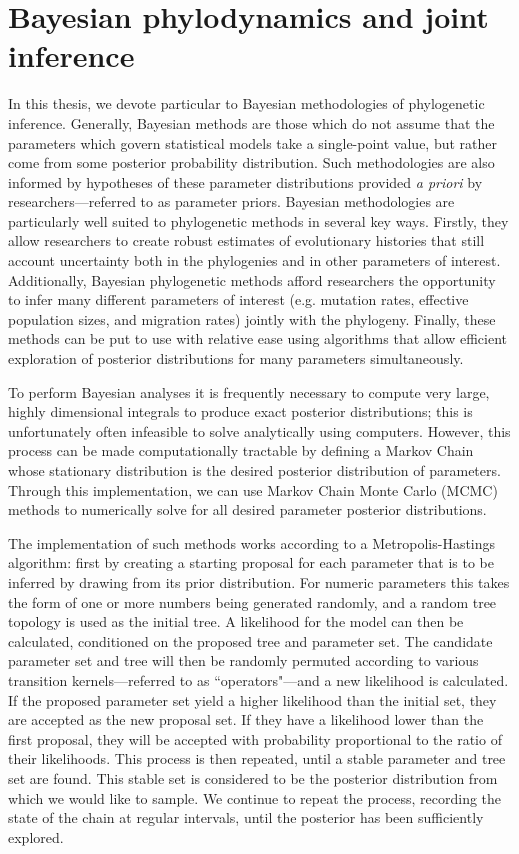 \section{Bayesian phylodynamics and joint inference}

In this thesis, we devote particular to Bayesian methodologies of phylogenetic inference.
Generally, Bayesian methods are those which do not assume that the parameters which govern statistical models take a single-point value, but rather come from some posterior probability distribution.
Such methodologies are also informed by hypotheses of these parameter distributions provided \textit{a priori} by researchers---referred to as parameter priors.
Bayesian methodologies are particularly well suited to phylogenetic methods in several key ways.
Firstly, they allow researchers to create robust estimates of evolutionary histories that still account uncertainty both in the phylogenies and in other parameters of interest.
Additionally, Bayesian phylogenetic methods afford researchers the opportunity to infer many different parameters of interest (e.g. mutation rates, effective population sizes, and migration rates) jointly with the phylogeny.
Finally, these methods can be put to use with relative ease using algorithms that allow efficient exploration of posterior distributions for many parameters simultaneously.

To perform Bayesian analyses it is frequently necessary to compute very large, highly dimensional integrals to produce exact posterior distributions; this is unfortunately often infeasible to solve analytically using computers.
However, this process can be made computationally tractable by defining a Markov Chain whose stationary distribution is the desired posterior distribution of parameters.
Through this implementation, we can use Markov Chain Monte Carlo (MCMC) methods to numerically solve for all desired parameter posterior distributions.

The implementation of such methods works according to a  Metropolis-Hastings algorithm: first by creating a starting proposal for each parameter that is to be inferred by drawing from its prior distribution.
For numeric parameters this takes the form of one or more numbers being generated randomly, and a random tree topology is used as the initial tree.
A likelihood for the model can then be calculated, conditioned on the proposed tree and parameter set.
The candidate parameter set and tree will then be randomly permuted according to various transition kernels---referred to as ``operators"---and a new likelihood is calculated.
If the proposed parameter set yield a higher likelihood than the initial set, they are accepted as the new proposal set.
If they have a likelihood lower than the first proposal, they will be accepted with probability proportional to the ratio of their likelihoods.
This process is then repeated, until a stable parameter and tree set are found.
This stable set is considered to be the posterior distribution from which we would like to sample.
We continue to repeat the process, recording the state of the chain at regular intervals, until the posterior has been sufficiently explored.

